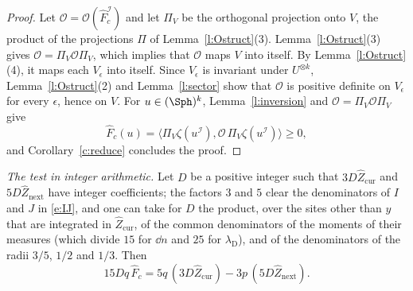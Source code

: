 \begin{proof}
Let $\mathcal O = \mathcal O(\hat F_c^{\mathcal I})$ and let $\Pi_V$ be the orthogonal projection onto $V$, the product of the projections $\Pi$ of Lemma~\ref{l:Ostruct}(3). Lemma~\ref{l:Ostruct}(3) gives $\mathcal O = \Pi_V \mathcal O \Pi_V$, which implies that $\mathcal O$ maps $V$ into itself. By Lemma~\ref{l:Ostruct}(4), it maps each $V_\epsilon$ into itself. Since $V_\epsilon$ is invariant under $U^{\otimes k}$, Lemma~\ref{l:Ostruct}(2) and Lemma~\ref{l:sector} show that $\mathcal O$ is positive definite on $V_\epsilon$ for every $\epsilon$, hence on $V$. For $u \in (\Sph)^k$, Lemma~\ref{l:inversion} and $\mathcal O = \Pi_V \mathcal O \Pi_V$ give
\begin{equation*}
\hat F_c(u) = \bigl\langle \Pi_V \zeta(u^{\mathcal I}), \mathcal O \, \Pi_V \zeta(u^{\mathcal I}) \bigr\rangle \ge 0 ,
\end{equation*}
and Corollary~\ref{c:reduce} concludes the proof.
\end{proof}

\emph{The test in integer arithmetic.} Let $D$ be a positive integer such that $3 D \hat Z_{\mathrm{cur}}$ and $5 D \hat Z_{\mathrm{next}}$ have integer coefficients; the factors $3$ and $5$ clear the denominators of $I$ and $J$ in \eqref{e:IJ}, and one can take for $D$ the product, over the sites other than $y$ that are integrated in $\hat Z_{\mathrm{cur}}$, of the common denominators of the moments of their measures (which divide $15$ for $\dd n$ and $25$ for $\lambda_{\mathrm D}$), and of the denominators of the radii $3/5$, $1/2$ and $1/3$. Then
\begin{equation}\label{e:intscale}
15 D q \, \hat F_c = 5 q \, (3 D \hat Z_{\mathrm{cur}}) - 3 p \, (5 D \hat Z_{\mathrm{next}}) .
\end{equation}


